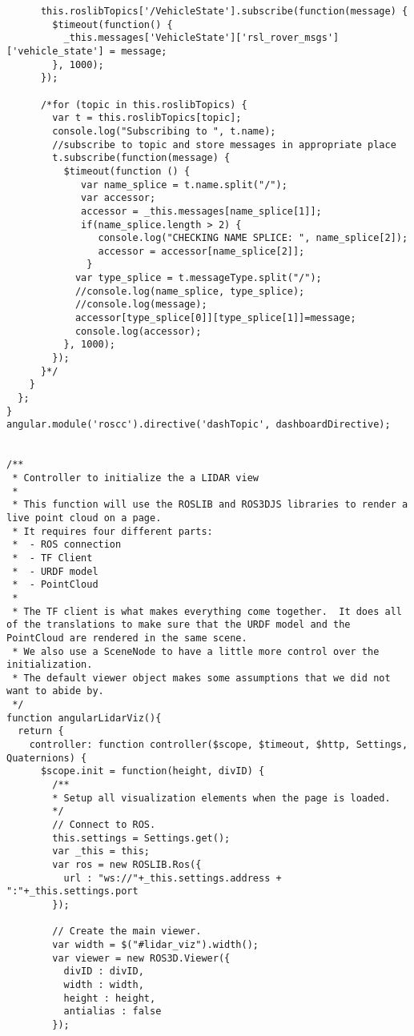 \begin{verbatim}
      this.roslibTopics['/VehicleState'].subscribe(function(message) {
        $timeout(function() {
          _this.messages['VehicleState']['rsl_rover_msgs']['vehicle_state'] = message;
        }, 1000);
      });

      /*for (topic in this.roslibTopics) {
        var t = this.roslibTopics[topic];
        console.log("Subscribing to ", t.name);
        //subscribe to topic and store messages in appropriate place
        t.subscribe(function(message) {
          $timeout(function () {
             var name_splice = t.name.split("/");
             var accessor;
             accessor = _this.messages[name_splice[1]];
             if(name_splice.length > 2) {
                console.log("CHECKING NAME SPLICE: ", name_splice[2]);
                accessor = accessor[name_splice[2]];
              }
            var type_splice = t.messageType.split("/");
            //console.log(name_splice, type_splice);
            //console.log(message);
            accessor[type_splice[0]][type_splice[1]]=message;
            console.log(accessor);
          }, 1000);
        });
      }*/
    }
  };
}
angular.module('roscc').directive('dashTopic', dashboardDirective);


/**
 * Controller to initialize the a LIDAR view
 *
 * This function will use the ROSLIB and ROS3DJS libraries to render a live point cloud on a page.
 * It requires four different parts:
 *  - ROS connection
 *  - TF Client
 *  - URDF model
 *  - PointCloud
 *
 * The TF client is what makes everything come together.  It does all of the translations to make sure that the URDF model and the PointCloud are rendered in the same scene.
 * We also use a SceneNode to have a little more control over the initialization.
 * The default viewer object makes some assumptions that we did not want to abide by.
 */
function angularLidarViz(){
  return {
    controller: function controller($scope, $timeout, $http, Settings, Quaternions) {
      $scope.init = function(height, divID) {
        /**
        * Setup all visualization elements when the page is loaded.
        */
        // Connect to ROS.
        this.settings = Settings.get();
        var _this = this;
        var ros = new ROSLIB.Ros({
          url : "ws://"+_this.settings.address + ":"+_this.settings.port
        });

        // Create the main viewer.
        var width = $("#lidar_viz").width();
        var viewer = new ROS3D.Viewer({
          divID : divID,
          width : width,
          height : height,
          antialias : false
        });


\end{verbatim}
